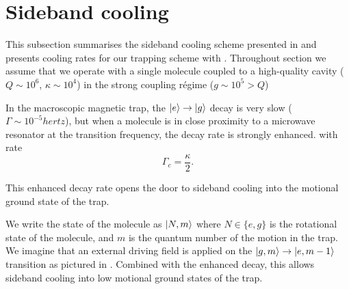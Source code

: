 \section{Sideband cooling}


This subsection summarises the sideband cooling scheme presented in
 and presents cooling rates for our trapping scheme with
\CaF{}.  Throughout section we assume that we operate with a single molecule
coupled to a high-quality cavity ($Q\sim10^6$, $\kappa \sim 10^4$) in the
strong coupling r\'egime ($g\sim10^5>Q$)

In the macroscopic magnetic trap, the
$\ket{e}\rightarrow\ket{g}$ decay is very slow ($\Gamma \sim
10^{-5}\si{hertz}$), but when a molecule is in close proximity to a microwave
resonator at the transition frequency, the decay rate is strongly enhanced. 
with rate
%
\begin{equation}
  \Gamma_c = \frac{\kappa}{2}.
\end{equation}

This enhanced decay rate opens the door to sideband cooling into the motional
ground state of the trap.

We write the state of the molecule as $\ket{N, m}$ where $N\in\{e,g\}$ is the
rotational state of the molecule, and $m$ is the quantum number of the motion
in the trap. We imagine that an external driving field is applied on the
$\ket{g, m} \rightarrow \ket{e, m-1}$ transition as pictured in
. Combined with the enhanced decay, this allows
sideband cooling into low motional ground states of the trap.


